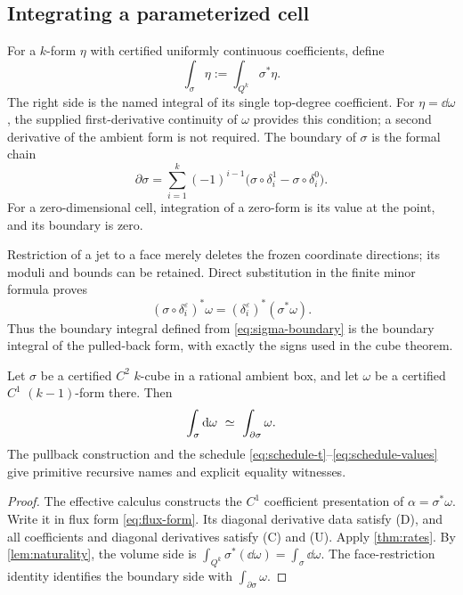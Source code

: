 \subsection{Integrating a parameterized cell}

For a $k$-form $\eta$ with certified uniformly continuous coefficients,
define
\[
 \int_\sigma\eta:=\int_{Q^k}\sigma^*\eta.
\]
The right side is the named integral of its single top-degree coefficient.
For $\eta=\dd\omega$, the supplied first-derivative continuity of
$\omega$ provides this condition; a second derivative of the ambient
form is not required.
The boundary of $\sigma$ is the formal chain
\begin{equation}\label{eq:sigma-boundary}
 \partial\sigma
 =\sum_{i=1}^k(-1)^{i-1}
         \bigl(\sigma\circ\delta_i^1-\sigma\circ\delta_i^0\bigr).
\end{equation}
For a zero-dimensional cell, integration of a zero-form is its value
at the point, and its boundary is zero.

Restriction of a jet to a face merely deletes the frozen coordinate
directions; its moduli and bounds can be retained. Direct substitution
in the finite minor formula proves
\[
 (\sigma\circ\delta_i^\varepsilon)^*\omega
       =(\delta_i^\varepsilon)^*(\sigma^*\omega).
\]
Thus the boundary integral defined from \eqref{eq:sigma-boundary} is the
boundary integral of the pulled-back form, with exactly the signs used
in the cube theorem.

\begin{theorem}\label{thm:curved}
Let $\sigma$ be a certified $C^2$ $k$-cube in a rational ambient box, and
let $\omega$ be a certified $C^1$ $(k-1)$-form there. Then
\[
 \int_\sigma\dd\omega\ \EqName\ \int_{\partial\sigma}\omega .
\]
The pullback construction and the schedule
\eqref{eq:schedule-t}--\eqref{eq:schedule-values} give primitive recursive
names and explicit equality witnesses.
\end{theorem}
\begin{proof}
The effective calculus constructs the $C^1$ coefficient presentation of
$\alpha=\sigma^*\omega$. Write it in flux form \eqref{eq:flux-form}.
Its diagonal derivative data satisfy (D), and all coefficients and
diagonal derivatives satisfy (C) and (U). Apply \cref{thm:rates}.
By \cref{lem:naturality}, the volume side is
$\int_{Q^k}\sigma^*(\dd\omega)=\int_\sigma\dd\omega$.
The face-restriction identity identifies the boundary side with
$\int_{\partial\sigma}\omega$.
\end{proof}

